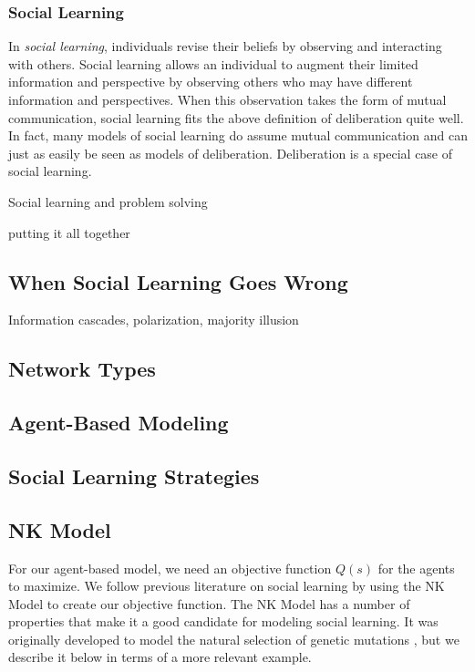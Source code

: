 \documentclass[manuscript,screen,review,acmsmall]{acmart}
\begin{document}
\subsubsection{Social Learning}
In {\em social learning}, individuals revise their beliefs by observing and interacting with others.
Social learning allows an individual to augment their limited information and perspective by observing others who may have different information
and perspectives.
When this observation takes the form of mutual communication,
social learning fits the above definition of deliberation quite well.
In fact, many models of social learning do assume mutual communication
\cite{golub_naive_2010, lazer_network_2007, mason_collaborative_2012, barkoczi_social_2016, gomez_clustering_2019}
and can just as easily be seen as models of deliberation.
Deliberation is a special case of social learning.

Social learning and problem solving

putting it all together

\subsection{When Social Learning Goes Wrong}
Information cascades, polarization, majority illusion

\subsection{Network Types}

\subsection{Agent-Based Modeling\label{subsec:abm}}

\subsection{Social Learning Strategies}

\subsection{NK Model\label{subsec:nk}}
For our agent-based model, we need an objective function $Q(s)$ for the agents to maximize.
We follow previous literature on social learning
\cite{lazer_network_2007,barkoczi_social_2016,gomez_clustering_2019}
by using the NK Model \cite{kauffman_towards_1987,weinberger_local_1991} to create our objective function.
The NK Model has a number of properties that make it a good candidate for modeling social learning.
It was originally developed to model the natural selection of genetic mutations \cite{kauffman_towards_1987},
but we describe it below in terms of a more relevant example.
\end{document}
